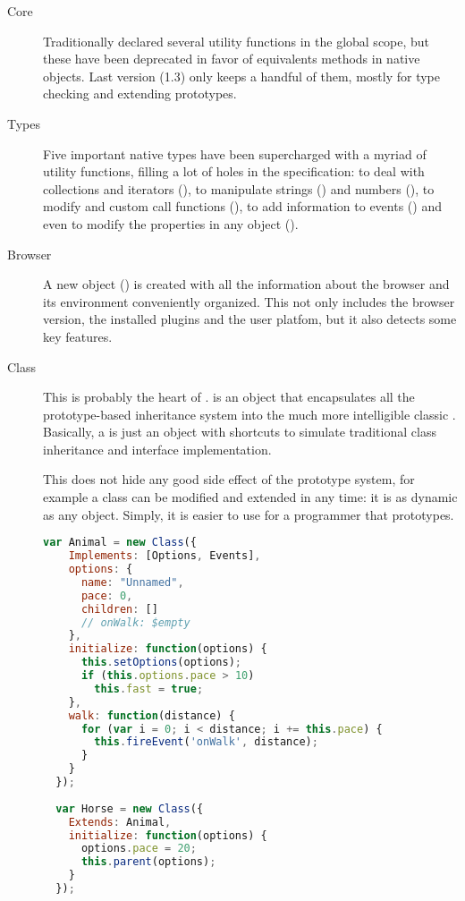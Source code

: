 \begin{description}
  \item[Core] Traditionally  declared several utility functions in the global scope, but these have been deprecated in favor of equivalents methods in native objects.
  Last version (1.3) only keeps a handful of them, mostly for type checking and extending prototypes.
  \item[Types] Five important native types have been supercharged with a myriad of utility functions, filling a lot of holes in the  specification: to deal with collections and iterators (), to manipulate strings () and numbers (), to modify and custom call functions (), to add information to events () and even to modify the properties in any object ().
  \item[Browser] A new object () is created with all the information about the browser and its environment conveniently organized.
  This not only includes the browser version, the installed plugins and the user platfom, but it also detects some key features.
  \item[Class] This is probably the heart of .
   is an object that encapsulates all the prototype-based inheritance system into the much more intelligible classic .
  Basically, a  is just an object with shortcuts to simulate traditional class inheritance and interface implementation.
  
  This does not hide any good side effect of the prototype system, for example a class can be modified and extended in any time: it is as dynamic as any  object.
  Simply, it is easier to use for a programmer that prototypes.
  
\begin{lstlisting}[language=JavaScript,label=mootoolsclass,caption=MooTools class definitions]
  var Animal = new Class({
    Implements: [Options, Events],
    options: {
      name: "Unnamed",
      pace: 0,
      children: []
      // onWalk: $empty
    },
    initialize: function(options) {
      this.setOptions(options);
      if (this.options.pace > 10)
        this.fast = true;
    },
    walk: function(distance) {
      for (var i = 0; i < distance; i += this.pace) {
        this.fireEvent('onWalk', distance);
      }
    }
  });
  
  var Horse = new Class({
    Extends: Animal,
    initialize: function(options) {
      options.pace = 20;
      this.parent(options);
    }
  });
\end{lstlisting}
  

\end{description}
